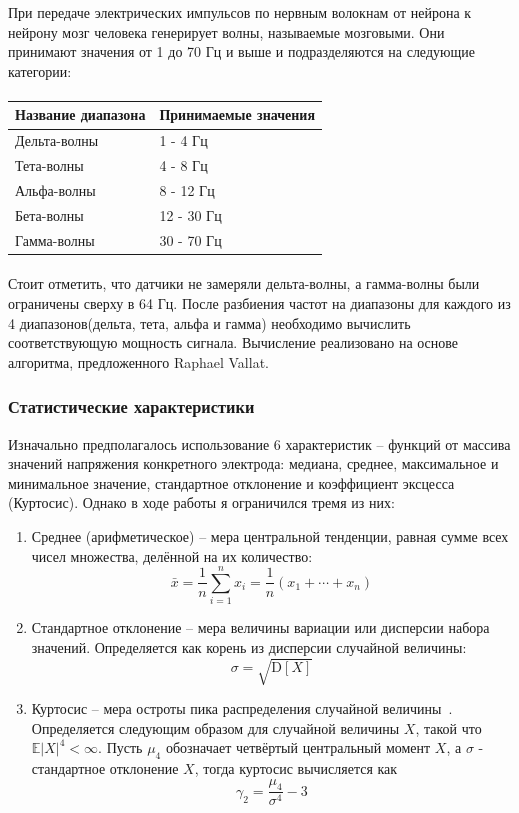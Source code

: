 \documentclass{article}
\begin{document}
При передаче электрических импульсов по нервным волокнам от нейрона к нейрону мозг человека генерирует волны, называемые мозговыми. Они принимают значения от 1 до 70 Гц и выше и подразделяются на следующие категории:

\setlength{\tabcolsep}{18pt}
\renewcommand{\arraystretch}{1.5}

\paragraph{}
\begin{tabular}{|m{5cm}|m{5cm}|}
    \hline
    \textbf{Название диапазона} & \textbf{Принимаемые значения}\\
    \hline
    Дельта-волны & 1 - 4 Гц\\
    \hline
    Тета-волны & 4 - 8 Гц\\
    \hline
    Альфа-волны & 8 - 12 Гц\\
    \hline
    Бета-волны & 12 - 30 Гц\\
    \hline
    Гамма-волны & 30 - 70 Гц\\
    \hline  
\end{tabular}
\paragraph{}

Стоит отметить, что датчики не замеряли дельта-волны, а гамма-волны были ограничены сверху в 64 Гц. После разбиения частот на диапазоны для каждого из 4 диапазонов(дельта, тета, альфа и гамма) необходимо вычислить соответствующую мощность сигнала. Вычисление реализовано на основе алгоритма, предложенного Raphael Vallat\cite{Vallat}.


\subsubsection{Статистические характеристики}
Изначально предполагалось использование 6 характеристик -- функций от массива значений напряжения конкретного электрода: медиана, среднее, максимальное и минимальное значение, стандартное отклонение и коэффициент эксцесса (Куртосис). Однако в ходе работы я ограничился тремя из них:
\begin{enumerate}
\item Среднее (арифметическое) -- мера центральной тенденции, равная сумме всех чисел множества, делённой на их количество:
$$\bar{x} = \frac{1}{n}\sum_{i=1}^n x_i  =  \frac{1}{n} (x_1+\cdots+x_n)$$
\item Стандартное отклонение -- мера величины вариации или дисперсии набора значений. Определяется как корень из дисперсии случайной величины:
$$\sigma = \sqrt{\mathrm{D}[X]}$$
\item Куртосис -- мера остроты пика распределения случайной величины~\cite{Kurtosis}. Определяется следующим образом для случайной величины $X$, такой что $\mathbb{E}|X|^4 < \infty$. Пусть $\mu_4$ обозначает четвёртый центральный момент $X$, а $\sigma$ - стандартное отклонение $X$, тогда куртосис вычисляется как $$\gamma_2 = \frac{\mu_4}{\sigma^4} - 3$$

\end{enumerate}
\end{document}
